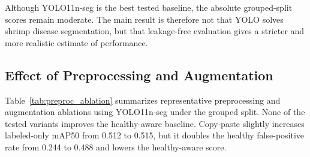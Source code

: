 \documentclass{svproc}
\begin{document}
\begin{table}
\caption{YOLO model sweep under the stratified grouped-specimen split.}
\label{tab:model_sweep}
\begin{center}
\scriptsize
\setlength{\tabcolsep}{4pt}
\renewcommand{\arraystretch}{1.08}
\end{center}
\end{table}

Although YOLO11n-seg is the best tested baseline, the absolute grouped-split scores remain moderate. The main result is therefore not that YOLO solves shrimp disease segmentation, but that leakage-free evaluation gives a stricter and more realistic estimate of performance.

\subsection{Effect of Preprocessing and Augmentation}

Table~\ref{tab:preproc_ablation} summarizes representative preprocessing and augmentation ablations using YOLO11n-seg under the grouped split. None of the tested variants improves the healthy-aware baseline. Copy-paste slightly increases labeled-only mAP50 from 0.512 to 0.515, but it doubles the healthy false-positive rate from 0.244 to 0.488 and lowers the healthy-aware score.
\end{document}
